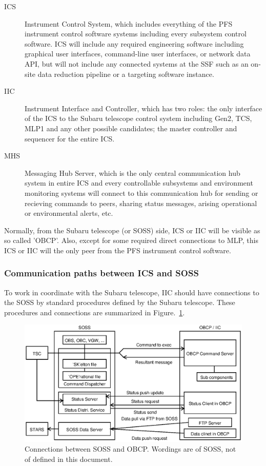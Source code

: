 \documentclass[a4paper,notitlepage]{article}
\begin{document}
\begin{description}
  \item[ICS] Instrument Control System, which includes everything of the 
    PFS instrument control software systems including every subsystem 
    control software. ICS will include any required engineering software 
    including graphical user interfaces, command-line user interfaces, or 
    network data API, but will not include any connected systems at the SSF 
    such as an on-site data reduction pipeline or a targeting software 
    instance. 
  \item[IIC] Instrument Interface and Controller, which has two roles: 
    the only interface of the ICS to the Subaru telescope control system 
    including Gen2, TCS, MLP1 and any other possible candidates; the master 
    controller and sequencer for the entire ICS.
  \item[MHS] Messaging Hub Server, which is the only central communication hub 
    system in entire ICS and every controllable subsystems and environment 
    monitoring systems will connect to this communication hub for sending or 
    recieving commands to peers, sharing status messages, arising operational 
    or environmental alerts, etc.
\end{description}

Normally, from the Subaru telescope (or SOSS) side, ICS or IIC will be visible 
as so called 'OBCP'. Also, except for some required direct connections to MLP, 
this ICS or IIC will the only peer from the PFS instrument control software. 


\subsubsection{Communication paths between ICS and SOSS}

To work in coordinate with the Subaru telescope, IIC should have connections 
to the SOSS by standard procedures defined by the Subaru telescope. 
These procedures and connections are summarized in 
Figure.~\ref{fig:ics-soss-connection}. 

\begin{figure}[htb]
  \begin{center}
    \includegraphics[scale=0.75]{ics-soss-connection.eps}
  \end{center}
  \caption{Connections between SOSS and OBCP. Wordings are of SOSS, not of 
      defined in this document.}
  \label{fig:ics-soss-connection}
\end{figure}
\end{document}
